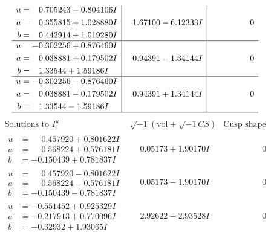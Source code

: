 \documentclass[1p]{elsarticle_modified}
\theoremstyle{definition}
\newcommand{\I}{\sqrt{-1}}
\begin{document}
$$\begin{array}{c|c|c}
\begin{aligned}
u &= \phantom{-}0.705243 - 0.804106 I \\
a &= \phantom{-}0.355815 + 1.028880 I \\
b &= \phantom{-}0.442914 + 1.019280 I\end{aligned}
 & \phantom{-}1.67100 - 6.12333 I & \phantom{-0.000000 } 0 \\ \hline\begin{aligned}
u &= -0.302256 + 0.876460 I \\
a &= \phantom{-}0.038881 + 0.179502 I \\
b &= \phantom{-}1.33544 + 1.59186 I\end{aligned}
 & \phantom{-}0.94391 - 1.34144 I & \phantom{-0.000000 } 0 \\ \hline\begin{aligned}
u &= -0.302256 - 0.876460 I \\
a &= \phantom{-}0.038881 - 0.179502 I \\
b &= \phantom{-}1.33544 - 1.59186 I\end{aligned}
 & \phantom{-}0.94391 + 1.34144 I & \phantom{-0.000000 } 0\\
 \hline 
 \end{array}$$\newpage$$\begin{array}{c|c|c}  
\text{Solutions to }I^u_{1}& \I (\text{vol} + \sqrt{-1}CS) & \text{Cusp shape}\\
 \hline 
\begin{aligned}
u &= \phantom{-}0.457920 + 0.801622 I \\
a &= \phantom{-}0.568224 + 0.576181 I \\
b &= -0.150439 + 0.781837 I\end{aligned}
 & \phantom{-}0.05173 + 1.90170 I & \phantom{-0.000000 } 0 \\ \hline\begin{aligned}
u &= \phantom{-}0.457920 - 0.801622 I \\
a &= \phantom{-}0.568224 - 0.576181 I \\
b &= -0.150439 - 0.781837 I\end{aligned}
 & \phantom{-}0.05173 - 1.90170 I & \phantom{-0.000000 } 0 \\ \hline\begin{aligned}
u &= -0.551452 + 0.925329 I \\
a &= -0.217913 + 0.770096 I \\
b &= -0.32932 + 1.93065 I\end{aligned}
 & \phantom{-}2.92622 - 2.93528 I & \phantom{-0.000000 } 0 \\ \hline\begin{aligned}

\end{aligned}
\end{array}$$
\end{document}
